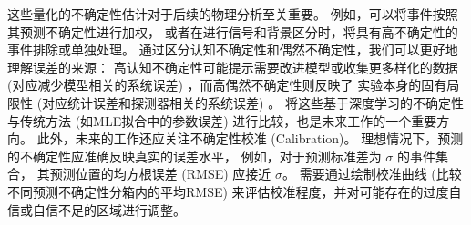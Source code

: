 这些量化的不确定性估计对于后续的物理分析至关重要。
例如，可以将事件按照其预测不确定性进行加权，
或者在进行信号和背景区分时，将具有高不确定性的事件排除或单独处理。
通过区分认知不确定性和偶然不确定性，我们可以更好地理解误差的来源：
高认知不确定性可能提示需要改进模型或收集更多样化的数据 
(对应减少模型相关的系统误差) ，而高偶然不确定性则反映了
实验本身的固有局限性 (对应统计误差和探测器相关的系统误差) 。
将这些基于深度学习的不确定性与传统方法 
(如MLE拟合中的参数误差) 进行比较，也是未来工作的一个重要方向。
此外，未来的工作还应关注不确定性校准 (Calibration)。
理想情况下，预测的不确定性应准确反映真实的误差水平，
例如，对于预测标准差为 $\sigma$ 的事件集合，
其预测位置的均方根误差 (RMSE) 应接近 $\sigma$。
需要通过绘制校准曲线 (比较不同预测不确定性分箱内的平均RMSE) 
来评估校准程度，并对可能存在的过度自信或自信不足的区域进行调整。


